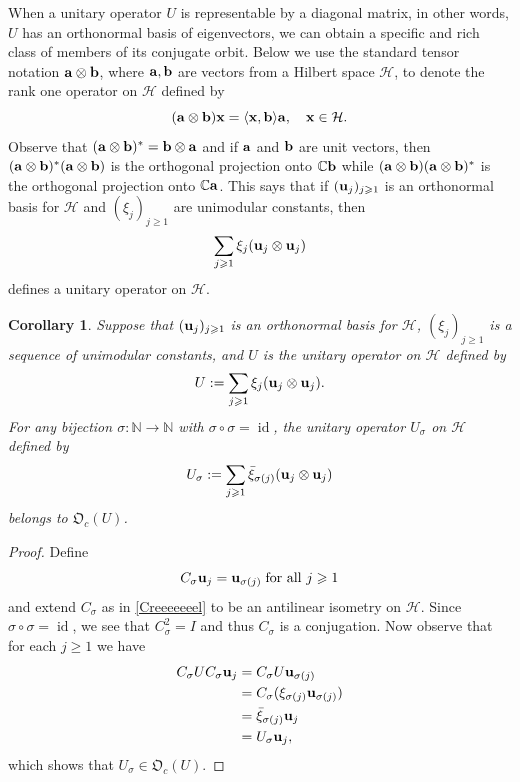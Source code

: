 \documentclass{dis}
\theoremstyle{plain}
\newtheorem{Corollary}[equation]{Corollary}
\theoremstyle{definition}
\def\C{\mathbb{C}}
\def\N{\mathbb{N}}
\renewcommand{\geq}{\geqslant}
\renewcommand{\vec}[1]{{\bf #1}}
\newcommand{\0}{{\color{lightgray}0}}
\begin{document}
When a unitary operator $U$ is representable by a diagonal matrix, in other words, $U$ has an orthonormal basis of eigenvectors, we can obtain a specific and rich class of  members of its conjugate orbit. Below we use the standard tensor notation $\vec{a} \otimes \vec{b}$, where $\vec{a}, \vec{b}$ are vectors from a Hilbert space $\mathcal{H}$, to denote the rank one operator on $\mathcal{H}$ defined by 
$$(\vec{a} \otimes \vec{b}) \vec{x} = \langle \vec{x}, \vec{b}\rangle \vec{a}, \quad \vec{x} \in \mathcal{H}.$$
Observe that $(\vec{a} \otimes \vec{b})^{*} = \vec{b} \otimes \vec{a}$ and if $\vec{a}$ and $\vec{b}$ are unit vectors, then $(\vec{a} \otimes \vec{b})^{*} ( \vec{a} \otimes \vec{b})$ is the orthogonal projection onto $\C \vec{b}$ while 
$(\vec{a} \otimes \vec{b})(\vec{a} \otimes \vec{b})^{*}$ is the orthogonal projection onto $\C \vec{a}$. This says that if $(\vec{u}_j)_{j \geq 1}$ is an orthonormal basis for $\mathcal{H}$ and $(\xi_j)_{j \geq 1}$ are unimodular constants, then 
$$\sum_{j \geq 1} \xi_j (\vec{u}_{j} \otimes \vec{u}_j)$$ defines a unitary operator on $\mathcal{H}$. 

\begin{Corollary}\label{C27}
Suppose that $(\vec{u}_{j})_{j \geq 1}$ is an orthonormal basis for $\mathcal{H}$, $(\xi_j)_{j \geq 1}$ is a sequence of unimodular constants, and $U$ is the unitary operator on $\mathcal{H}$ defined by
$$U  := \sum_{j \geq 1} \xi_{j}  (\vec{u}_j \otimes  \vec{u}_{j}).$$
For any bijection $\sigma: \N \to \N$ with $\sigma \circ \sigma = \operatorname{id}$, the unitary operator $U_{\sigma}$ on $\mathcal{H}$ defined by
$$U_{\sigma} :=  \sum_{j \geq 1} \bar \xi_{\sigma(j)} (\vec{u}_j \otimes \vec{u}_{j})$$ belongs to $\mathfrak{O}_c(U)$.
\end{Corollary}

\begin{proof}
Define  
\begin{equation}\label{66tt55RFDDS}
C_{\sigma} \vec{u}_j = \vec{u}_{\sigma(j)} \; \mbox{for all $j \geq 1$}
\end{equation}
 and extend $C_{\sigma}$ as in \eqref{Creeeeeeel}  to be an antilinear isometry on $\mathcal{H}$. Since $\sigma \circ \sigma = \operatorname{id}$, we see that $C_{\sigma}^{2} = I$ and thus $C_{\sigma}$ is a conjugation. Now observe that for each $j \geq 1$ we have
\begin{align*}
C_{\sigma} U C_{\sigma} \vec{u}_j & = C_{\sigma} U \vec{u}_{\sigma(j)}\\
& = C_{\sigma}( \xi_{\sigma(j)} \vec{u}_{\sigma(j)})\\
& = \bar \xi_{\sigma(j)} \vec{u}_{j}\\
& = U_{\sigma} \vec{u}_j,
\end{align*}
which shows that $U_{\sigma} \in \mathfrak{O}_c(U)$.
\end{proof}
\end{document}
